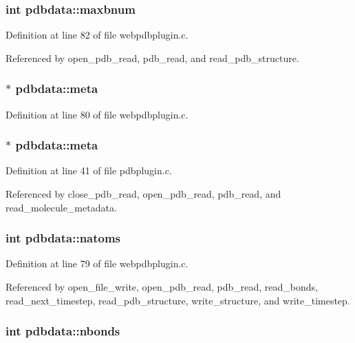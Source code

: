 \subsubsection{\setlength{\rightskip}{0pt plus 5cm}int pdbdata::maxbnum}\label{structpdbdata_m12}




Definition at line 82 of file webpdbplugin.c.

Referenced by open\_\-pdb\_\-read, pdb\_\-read, and read\_\-pdb\_\-structure.
\subsubsection{$\ast$ pdbdata::meta}\label{structpdbdata_m18}




Definition at line 80 of file webpdbplugin.c.
\subsubsection{$\ast$ pdbdata::meta}\label{structpdbdata_m9}




Definition at line 41 of file pdbplugin.c.

Referenced by close\_\-pdb\_\-read, open\_\-pdb\_\-read, pdb\_\-read, and read\_\-molecule\_\-metadata.
\subsubsection{\setlength{\rightskip}{0pt plus 5cm}int pdbdata::natoms}\label{structpdbdata_m1}




Definition at line 79 of file webpdbplugin.c.

Referenced by open\_\-file\_\-write, open\_\-pdb\_\-read, pdb\_\-read, read\_\-bonds, read\_\-next\_\-timestep, read\_\-pdb\_\-structure, write\_\-structure, and write\_\-timestep.
\subsubsection{\setlength{\rightskip}{0pt plus 5cm}int pdbdata::nbonds}\label{structpdbdata_m11}




